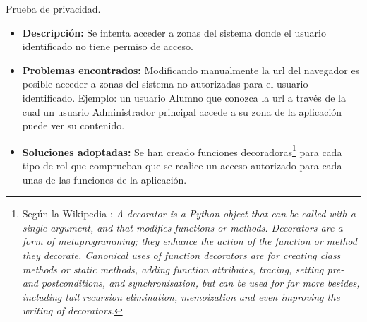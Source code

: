 \item Prueba de privacidad.
  \begin{itemize}
    \item \textbf{Descripción:} Se intenta acceder a zonas del sistema donde el
    usuario identificado no tiene permiso de acceso.
    \item \textbf{Problemas encontrados:} Modificando manualmente la url del
    navegador es posible acceder a zonas del sistema no autorizadas para el
    usuario identificado. Ejemplo: un usuario Alumno que conozca la url a través
    de la cual un usuario Administrador principal accede a su zona de la
    aplicación puede ver su contenido.
    \item \textbf{Soluciones adoptadas:} Se han creado funciones
    decoradoras\footnote{Según la Wikipedia \cite{wikipedia} : \textit{A
    decorator is a Python object that can be called with a single argument, and
    that modifies functions or methods. Decorators are a form of
    metaprogramming; they enhance the action of the function or method they
    decorate. Canonical uses of function decorators are for creating class
    methods or static methods, adding function attributes, tracing, setting pre-
    and postconditions, and synchronisation, but can be used for far more
    besides, including tail recursion elimination, memoization and even
    improving the writing of decorators.}}
    para cada tipo de rol que comprueban que se realice un acceso autorizado
    para cada unas de las funciones de la aplicación.
  \end{itemize}
